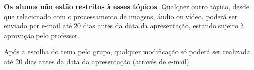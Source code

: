 \documentclass[a4paper,11pt]{article}
\begin{document}
{\bf Os alunos não estão restritos à esses tópicos}. Qualquer outro tópico,
desde que relacionado com o processamento de imagens, áudio ou vídeo, poderá ser
enviado por e-mail até 20 dias antes da data da apresentação, estando sujeito à
aprovação pelo professor.

Após a escolha do tema pelo grupo, qualquer modificação só poderá ser realizada
até 20 dias antes da data da apresentação (através de e-mail).
\end{document}
